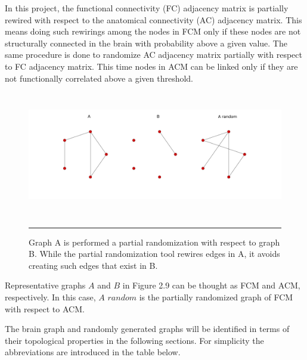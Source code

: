 In this project, the functional connectivity (FC) adjacency matrix is partially rewired with respect to the anatomical connectivity (AC) adjacency matrix.  This means doing such rewirings among the nodes in FCM only if these nodes are not structurally connected in the brain with probability above a given value. The same procedure is done to randomize AC adjacency matrix partially with respect to FC adjacency matrix.  This time nodes in ACM can be linked only if they are not functionally correlated above a given threshold.   

\begin{figure}[htbp]
  \centering
	\includegraphics[width=\textwidth, height=55mm]{Figures/p1.png}  
    \rule{35em}{0.5pt}
    \caption[Partial Randomization Example]{Graph A is performed a partial randomization with respect to graph B. While the partial randomization tool rewires edges in A, it avoids creating such edges that exist in B.}
  \label{fig:Partial Randomization Example}
\end{figure}

Representative graphs $A$ and $B$ in Figure 2.9 can be thought as FCM and ACM, respectively. In this case, $A \,\, random$ is the partially randomized graph of FCM with respect to ACM.


The brain graph and randomly generated graphs will be identified in terms of their topological properties in the following sections. For simplicity the abbreviations are introduced in the table below. 

